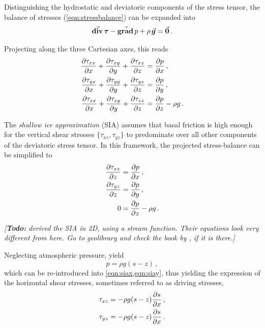 \documentclass{article}
\newcommand{\todo}[1]{\emph{[\textbf{Todo:} #1]}}
\newcommand{\vect}[1]{\va*{#1}} %
\newcommand{\tens}[1]{\vb*{#1}} %
\renewcommand{\grad}[1]{\vect{\mathrm{grad}}\,#1}   %
\newcommand{\tdiv}[1]{\vect{\mathrm{div}}\,#1}      %
\newcommand{\DST}[0]{\tens{\tau}}       %
\begin{document}
Distinguishing the hydrostatic and deviatoric components of the stress tensor,
the balance of stresses (\ref{eqn:stressbalance}) can be expanded into
\begin{equation}
    \tdiv{\DST} - \grad{p} + \rho\,\vect{g} = \vect{0} \,.
\end{equation}

Projecting along the three Cartesian axes, this reads
\begin{subequations}
\label{eqn:fullstokes}
\begin{align}
    \pdv{\tau_{xx}}{x} + \pdv{\tau_{xy}}{y} + \pdv{\tau_{xz}}{z}
        &= \pdv{p}{x} \,, \\
    \pdv{\tau_{yx}}{x} + \pdv{\tau_{yy}}{y} + \pdv{\tau_{yz}}{z}
        &= \pdv{p}{y} \,, \\
    \pdv{\tau_{zx}}{x} + \pdv{\tau_{zy}}{y} + \pdv{\tau_{zz}}{z}
        &= \pdv{p}{z} - \rho g \,.
\end{align}
\end{subequations}

The \emph{shallow ice approximation} (SIA) assumes that basal friction is high
enough
for the vertical shear stresses $\{\tau_{xz}, \tau_{yz}\}$ to predominate over
all other components of the deviatoric stress tensor. In this framework, the
projected stress-balance can be simplified to
\begin{subequations}
\label{eqn:sia}
\begin{align}
    \label{eqn:siax}
    \pdv{\tau_{xz}}{z} &= \pdv{p}{x} \,, \\
    \label{eqn:siay}
    \pdv{\tau_{yz}}{z} &= \pdv{p}{y} \,, \\
    \label{eqn:siaz}
    0 &= \pdv{p}{z} - \rho g \,.
\end{align}
\end{subequations}

\todo{\citet{Morland.Johnson.1980} derived the SIA in 2D, using a stream
      function. Their equations look very different from here. Go to
      geolibrary and check the book by \citet{Hutter.1983}, if it is there.}

Neglecting atmospheric pressure,  yield
\begin{equation}
    p = \rho g (s-z) \,,
\end{equation}
which can be re-introduced into \cref{eqn:siax,eqn:siay}, thus yielding the
expression of the horizontal shear stresses, sometimes referred to as driving
stresses,
\begin{subequations}
\begin{align}
    \tau_{xz} &= -\rho g (s-z) \pdv{s}{x} \,, \\
    \tau_{yz} &= -\rho g (s-z) \pdv{s}{x} \,.
\end{align}
\end{subequations}
\end{document}
